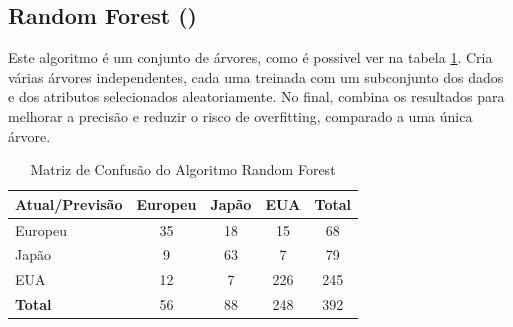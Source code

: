 \documentclass[conference]{IEEEtran}
\begin{document}
\subsection{Random Forest (\cite{forest})}
Este algoritmo é um conjunto de árvores, como é possivel ver na tabela \ref{tab:conf_matrix_forest}. Cria várias árvores
independentes, cada uma treinada com um subconjunto dos dados e dos atributos selecionados aleatoriamente. No final,
combina os resultados para melhorar a precisão e reduzir o risco de overfitting, comparado a uma única árvore.
\begin{table}[!ht]
	\centering
	\begin{tabular}{lcccc}
		\toprule
		\textbf{Atual/Previsão} & \textbf{Europeu} & \textbf{Japão} & \textbf{EUA} & \textbf{Total} \\
		\midrule
		Europeu                 & 35               & 18             & 15           & 68             \\
		Japão                   & 9                & 63             & 7            & 79             \\
		EUA                     & 12               & 7              & 226          & 245            \\
		\midrule
		\textbf{Total}          & 56               & 88             & 248          & 392            \\
		\bottomrule
	\end{tabular}
	\caption{Matriz de Confusão do Algoritmo Random Forest}
	\label{tab:conf_matrix_forest}

\end{table}

\end{document}
